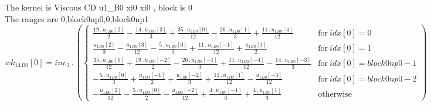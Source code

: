 \documentclass{article}
\begin{document}
\noindent The kernel is Viscous CD u1_B0 xi0 xi0 , block is 0\\\noindent The ranges are 0,block0np0,0,block0np1\\\begin{dmath}{wk_{14}{_{B0}}}[{0}] = inv_3 \,.\, \left(\begin{cases} \frac{19 \,.\, {u_{1}{_{B0}}}[{2}]}{2} - \frac{14 \,.\, {u_{1}{_{B0}}}[{3}]}{3} + \frac{35 \,.\, {u_{1}{_{B0}}}[{0}]}{12} - \frac{26 \,.\, {u_{1}{_{B0}}}[{1}]}{3} + \frac{11 \,.\, 
{u_{1}{_{B0}}}[{4}]}{12} & \text{for}\: {idx}[{0}] = 0 \\\frac{{u_{1}{_{B0}}}[{2}]}{3} - \frac{{u_{1}{_{B0}}}[{3}]}{12} - \frac{5 \,.\, {u_{1}{_{B0}}}[{0}]}{3} + \frac{11 \,.\, {u_{1}{_{B0}}}[{-1}]}{12} + \frac{{u_{1}{_{B0}}}[{1}]}{2} & \text{for}\: 
{idx}[{0}] = 1 \\\frac{35 \,.\, {u_{1}{_{B0}}}[{0}]}{12} + \frac{19 \,.\, {u_{1}{_{B0}}}[{-2}]}{2} - \frac{26 \,.\, {u_{1}{_{B0}}}[{-1}]}{3} + \frac{11 \,.\, {u_{1}{_{B0}}}[{-4}]}{12} - \frac{14 \,.\, {u_{1}{_{B0}}}[{-3}]}{3} & \text{for}\: 
{idx}[{0}] = block0np0 - 1 \\- \frac{5 \,.\, {u_{1}{_{B0}}}[{0}]}{3} + \frac{{u_{1}{_{B0}}}[{-1}]}{2} + \frac{{u_{1}{_{B0}}}[{-2}]}{3} + \frac{11 \,.\, {u_{1}{_{B0}}}[{1}]}{12} - \frac{{u_{1}{_{B0}}}[{-3}]}{12} & \text{for}\: {idx}[{0}] = block0np0 - 
2 \\- \frac{{u_{1}{_{B0}}}[{2}]}{12} - \frac{5 \,.\, {u_{1}{_{B0}}}[{0}]}{2} - \frac{{u_{1}{_{B0}}}[{-2}]}{12} + \frac{4 \,.\, {u_{1}{_{B0}}}[{-1}]}{3} + \frac{4 \,.\, {u_{1}{_{B0}}}[{1}]}{3} & \text{otherwise} \end{cases}\right)\end{dmath}
\end{document}
